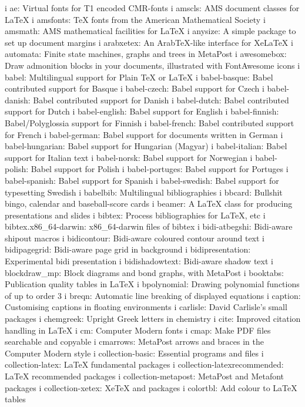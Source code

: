 i ae: Virtual fonts for T1 encoded CMR-fonts
i amscls: AMS document classes for LaTeX
i amsfonts: TeX fonts from the American Mathematical Society
i amsmath: AMS mathematical facilities for LaTeX
i anysize: A simple package to set up document margins
i arabxetex: An ArabTeX-like interface for XeLaTeX
i automata: Finite state machines, graphs and trees in MetaPost
i awesomebox: Draw admonition blocks in your documents, illustrated with FontAwesome icons
i babel: Multilingual support for Plain TeX or LaTeX
i babel-basque: Babel contributed support for Basque
i babel-czech: Babel support for Czech
i babel-danish: Babel contributed support for Danish
i babel-dutch: Babel contributed support for Dutch
i babel-english: Babel support for English
i babel-finnish: Babel/Polyglossia support for Finnish
i babel-french: Babel contributed support for French
i babel-german: Babel support for documents written in German
i babel-hungarian: Babel support for Hungarian (Magyar)
i babel-italian: Babel support for Italian text
i babel-norsk: Babel support for Norwegian
i babel-polish: Babel support for Polish
i babel-portuges: Babel support for Portuges
i babel-spanish: Babel support for Spanish
i babel-swedish: Babel support for typesetting Swedish
i babelbib: Multilingual bibliographies
i bbcard: Bullshit bingo, calendar and baseball-score cards
i beamer: A LaTeX class for producing presentations and slides
i bibtex: Process bibliographies for LaTeX, etc
i bibtex.x86_64-darwin: x86_64-darwin files of bibtex
i bidi-atbegshi: Bidi-aware shipout macros
i bidicontour: Bidi-aware coloured contour around text
i bidipagegrid: Bidi-aware page grid in background
i bidipresentation: Experimental bidi presentation
i bidishadowtext: Bidi-aware shadow text
i blockdraw_mp: Block diagrams and bond graphs, with MetaPost
i booktabs: Publication quality tables in LaTeX
i bpolynomial: Drawing polynomial functions of up to order 3
i breqn: Automatic line breaking of displayed equations
i caption: Customising captions in floating environments
i carlisle: David Carlisle's small packages
i chemgreek: Upright Greek letters in chemistry
i cite: Improved citation handling in LaTeX
i cm: Computer Modern fonts
i cmap: Make PDF files searchable and copyable
i cmarrows: MetaPost arrows and braces in the Computer Modern style
i collection-basic: Essential programs and files
i collection-latex: LaTeX fundamental packages
i collection-latexrecommended: LaTeX recommended packages
i collection-metapost: MetaPost and Metafont packages
i collection-xetex: XeTeX and packages
i colortbl: Add colour to LaTeX tables
